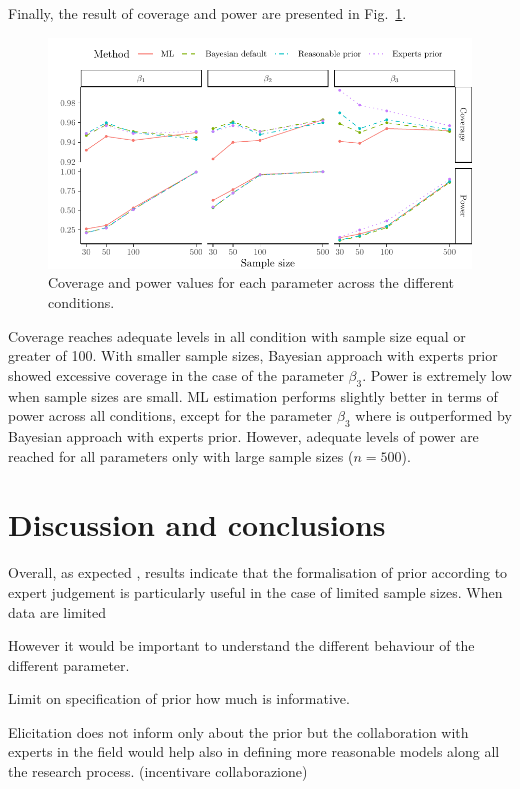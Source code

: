\documentclass[graybox]{svmult}
\begin{document}
Finally, the result of coverage and power are presented in Fig.~\ref{fig:Plot_coverage_power}.
\begin{figure}[b]
	\sidecaption
	\includegraphics[width = .9\textwidth]{figure/Plot_coverage_power}
	\caption{Coverage and power values for each parameter across the different conditions.}
	\label{fig:Plot_coverage_power}
\end{figure}
Coverage reaches adequate levels in all condition  with sample size  equal or greater of 100. With smaller sample sizes, Bayesian approach with experts prior showed excessive coverage in the case of the parameter $\beta_3$. Power is extremely low when sample sizes are small. ML estimation performs slightly better in terms of power across all conditions, except for the  parameter $\beta_3$ where is outperformed by Bayesian approach with experts prior. However, adequate levels of power are reached for all parameters only with large sample sizes ($n = 500$).

\section{Discussion and conclusions}

\label{sec:dicussion}

Overall, as expected , results indicate that the formalisation of prior according to expert judgement is particularly useful in the case of limited sample sizes. When data are limited 

However it would be important to understand the different behaviour of the different parameter.

Limit on specification of prior how much is informative.

Elicitation does not inform only about the prior but the collaboration with experts in the field would help also in defining more reasonable models along all the research process. (incentivare collaborazione)
\end{document}
